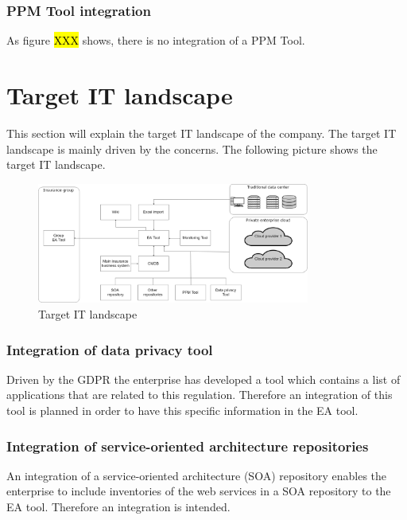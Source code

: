 \subsubsection{PPM Tool integration}

As figure \hl{XXX} shows, there is no integration of a PPM Tool.

\section{Target IT landscape}\label{section:targetitlandscape}

This section will explain the target IT landscape of the company. The target IT landscape is mainly driven by the concerns. The following picture shows the target IT landscape.

\begin{figure}[htpb]
  \centering
  \includegraphics[width=0.8\textwidth]{figures/target-it-landscape.png}
  \caption{ Target IT landscape~\parencite{Corpancho Villasana 2018}}
  \label{fig:Target IT landscape}
\end{figure}

\subsubsection{Integration of data privacy tool}
Driven by the GDPR the enterprise has developed a tool which contains a list of applications that are related to this regulation. Therefore an integration of this tool is planned in order to have this specific information in the EA tool.

\subsubsection{Integration of service-oriented architecture repositories}

An integration of a service-oriented architecture (SOA) repository enables the enterprise to include inventories of the web services in a SOA repository to the EA tool. Therefore an integration is intended.

